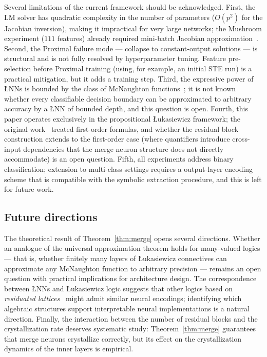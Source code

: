 \documentclass[12pt,a4paper]{article}
\newcommand{\LNN}{\L{}NN}
\begin{document}
Several limitations of the current framework should be acknowledged.
First, the LM solver has quadratic complexity in the number of parameters
($O(p^2)$ for the Jacobian inversion), making it impractical for very large
networks; the Mushroom experiment ($111$ features) already required mini-batch
Jacobian approximation~\cite{battiti1992}.
Second, the Proximal failure mode --- collapse to constant-output solutions ---
is structural and is not fully resolved by hyperparameter tuning.
Feature pre-selection before Proximal training (using, for example, an initial
STE run) is a practical mitigation, but it adds a training step.
Third, the expressive power of \LNN{}s is bounded by the class of McNaughton
functions~\cite{mcnaughton1951,hajek1998}; it is not known whether every
classifiable decision boundary can be approximated to arbitrary accuracy by a
\LNN{} of bounded depth, and this question is open.
Fourth, this paper operates exclusively in the propositional \L{}ukasiewicz
framework; the original work~\cite{leandro2009} treated first-order formulas,
and whether the residual block construction extends to the first-order case
(where quantifiers introduce cross-input dependencies that the merge neuron
structure does not directly accommodate) is an open question.
Fifth, all experiments address binary classification; extension to multi-class
settings requires a output-layer encoding scheme that is compatible with
the symbolic extraction procedure, and this is left for future work.

\subsection{Future directions}

The theoretical result of Theorem~\ref{thm:merge} opens several directions.
Whether an analogue of the universal approximation theorem holds for
many-valued logics --- that is, whether finitely many layers of \L{}ukasiewicz
connectives can approximate any McNaughton function to arbitrary
precision --- remains an open question with practical implications for
architecture design.
The correspondence between \LNN{}s and \L{}ukasiewicz logic suggests that
other logics based on \emph{residuated lattices}~\cite{hajek1998} might admit
similar neural encodings; identifying which algebraic structures support
interpretable neural implementations is a natural direction.
Finally, the interaction between the number of residual blocks and the
crystallization rate deserves systematic study: Theorem~\ref{thm:merge}
guarantees that merge neurons crystallize correctly, but its effect on the
crystallization dynamics of the inner layers is empirical.
\end{document}
